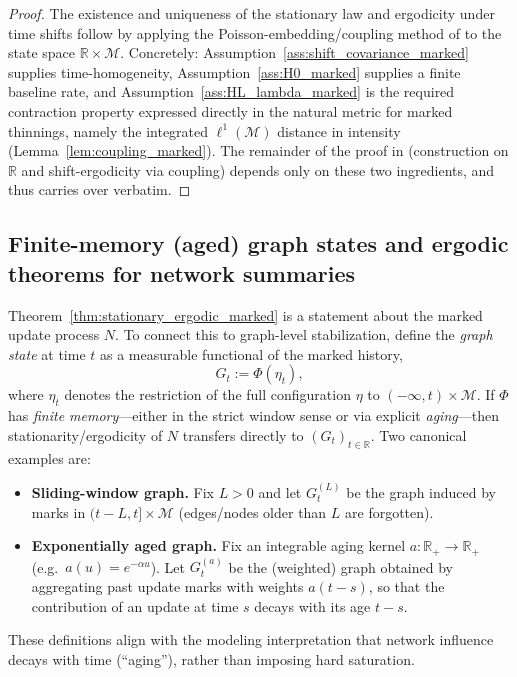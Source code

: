 \documentclass[12pt]{article}
\begin{document}
\begin{proof}
The existence and uniqueness of the stationary law and ergodicity under time shifts follow by applying the Poisson-embedding/coupling method of \citep{bremaud1996stability}
to the state space $\mathbb R\times\mathcal M$.
Concretely: Assumption~\ref{ass:shift_covariance_marked} supplies time-homogeneity, Assumption~\ref{ass:H0_marked} supplies a finite baseline rate,
and Assumption~\ref{ass:HL_lambda_marked} is the required contraction property expressed directly in the natural metric for marked thinnings,
namely the integrated $\ell^1(\mathcal M)$ distance in intensity (Lemma~\ref{lem:coupling_marked}).
The remainder of the proof in \citep{bremaud1996stability} (construction on $\mathbb R$ and shift-ergodicity via coupling) depends only on these two ingredients,
and thus carries over verbatim.
\end{proof}

\subsection{Finite-memory (aged) graph states and ergodic theorems for network summaries}
\label{sec:finite_memory_graphs}

Theorem~\ref{thm:stationary_ergodic_marked} is a statement about the marked update process $N$.
To connect this to graph-level stabilization, define the \emph{graph state} at time $t$ as a measurable functional of the marked history,
\[
G_t := \Phi(\eta_t),
\]
where $\eta_t$ denotes the restriction of the full configuration $\eta$ to $(-\infty,t)\times\mathcal M$.
If $\Phi$ has \emph{finite memory}---either in the strict window sense or via explicit \emph{aging}---then stationarity/ergodicity of $N$ transfers directly to $(G_t)_{t\in\mathbb R}$.
Two canonical examples are:
\begin{itemize}
\item \textbf{Sliding-window graph.} Fix $L>0$ and let $G_t^{(L)}$ be the graph induced by marks in $(t-L,t]\times\mathcal M$ (edges/nodes older than $L$ are forgotten).
\item \textbf{Exponentially aged graph.} Fix an integrable aging kernel $a:\mathbb R_+\to\mathbb R_+$ (e.g.\ $a(u)=e^{-\alpha u}$).
Let $G_t^{(a)}$ be the (weighted) graph obtained by aggregating past update marks with weights $a(t-s)$, so that the contribution of an update at time $s$ decays with its age $t-s$.
\end{itemize}
These definitions align with the modeling interpretation that network influence decays with time (``aging''), rather than imposing hard saturation.
\end{document}
